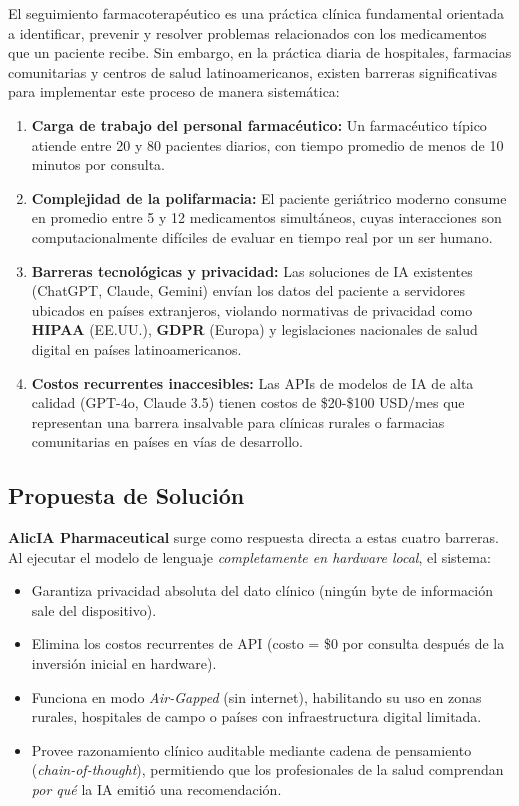 \documentclass[12pt,a4paper]{article}
\begin{document}
El seguimiento farmacoterapéutico es una práctica clínica fundamental orientada a identificar,
prevenir y resolver problemas relacionados con los medicamentos que un paciente recibe. Sin embargo,
en la práctica diaria de hospitales, farmacias comunitarias y centros de salud latinoamericanos,
existen barreras significativas para implementar este proceso de manera sistemática:

\begin{enumerate}[label=\textbf{\arabic*.}]
  \item \textbf{Carga de trabajo del personal farmacéutico:} Un farmacéutico típico atiende entre
    20 y 80 pacientes diarios, con tiempo promedio de menos de 10 minutos por consulta.
  \item \textbf{Complejidad de la polifarmacia:} El paciente geriátrico moderno consume en promedio
    entre 5 y 12 medicamentos simultáneos, cuyas interacciones son computacionalmente difíciles de
    evaluar en tiempo real por un ser humano.
  \item \textbf{Barreras tecnológicas y privacidad:} Las soluciones de IA existentes (ChatGPT,
    Claude, Gemini) envían los datos del paciente a servidores ubicados en países extranjeros,
    violando normativas de privacidad como \textbf{HIPAA} (EE.UU.), \textbf{GDPR} (Europa) y
    legislaciones nacionales de salud digital en países latinoamericanos.
  \item \textbf{Costos recurrentes inaccesibles:} Las APIs de modelos de IA de alta calidad
    (GPT-4o, Claude 3.5) tienen costos de \$20-\$100 USD/mes que representan una barrera
    insalvable para clínicas rurales o farmacias comunitarias en países en vías de desarrollo.
\end{enumerate}

\subsection{Propuesta de Solución}

\textbf{AlicIA Pharmaceutical} surge como respuesta directa a estas cuatro barreras. Al ejecutar
el modelo de lenguaje \textit{completamente en hardware local}, el sistema:

\begin{itemize}
  \item Garantiza privacidad absoluta del dato clínico (ningún byte de información sale del
    dispositivo).
  \item Elimina los costos recurrentes de API (costo = \$0 por consulta después de la inversión
    inicial en hardware).
  \item Funciona en modo \textit{Air-Gapped} (sin internet), habilitando su uso en zonas rurales,
    hospitales de campo o países con infraestructura digital limitada.
  \item Provee razonamiento clínico auditable mediante cadena de pensamiento (\textit{chain-of-thought}),
    permitiendo que los profesionales de la salud comprendan \textit{por qué} la IA emitió una
    recomendación.
\end{itemize}
\end{document}
